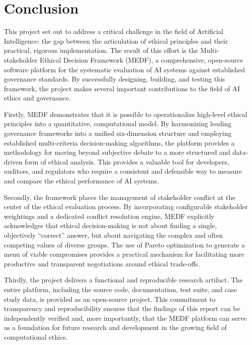 \chapter{Conclusion}
\label{ch:conclusion}

This project set out to address a critical challenge in the field of Artificial Intelligence: the gap between the articulation of ethical principles and their practical, rigorous implementation. The result of this effort is the Multi-stakeholder Ethical Decision Framework (MEDF), a comprehensive, open-source software platform for the systematic evaluation of AI systems against established governance standards. By successfully designing, building, and testing this framework, the project makes several important contributions to the field of AI ethics and governance.

Firstly, MEDF demonstrates that it is possible to operationalize high-level ethical principles into a quantitative, computational model. By harmonizing leading governance frameworks into a unified six-dimension structure and employing established multi-criteria decision-making algorithms, the platform provides a methodology for moving beyond subjective debate to a more structured and data-driven form of ethical analysis. This provides a valuable tool for developers, auditors, and regulators who require a consistent and defensible way to measure and compare the ethical performance of AI systems.

Secondly, the framework places the management of stakeholder conflict at the center of the ethical evaluation process. By incorporating configurable stakeholder weightings and a dedicated conflict resolution engine, MEDF explicitly acknowledges that ethical decision-making is not about finding a single, objectively \enquote{correct} answer, but about navigating the complex and often competing values of diverse groups. The use of Pareto optimization to generate a menu of viable compromises provides a practical mechanism for facilitating more productive and transparent negotiations around ethical trade-offs.

Thirdly, the project delivers a functional and reproducible research artifact. The entire platform, including the source code, documentation, test suite, and case study data, is provided as an open-source project. This commitment to transparency and reproducibility ensures that the findings of this report can be independently verified and, more importantly, that the MEDF platform can serve as a foundation for future research and development in the growing field of computational ethics.

